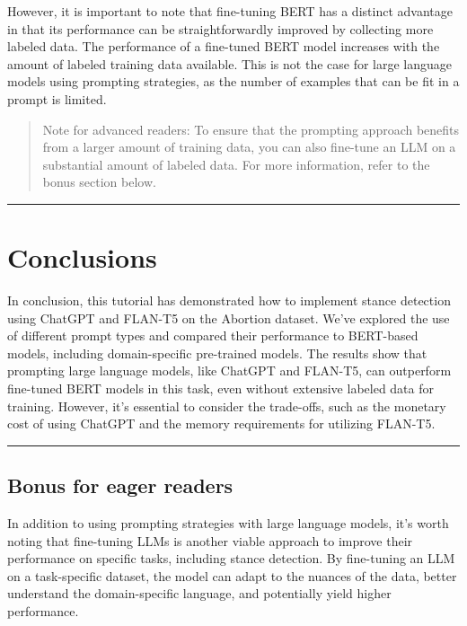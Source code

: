 \documentclass[11pt]{article}
\begin{document}
    However, it is important to note that fine-tuning BERT has a distinct
advantage in that its performance can be straightforwardly improved by
collecting more labeled data. The performance of a fine-tuned BERT model
increases with the amount of labeled training data available. This is
not the case for large language models using prompting strategies, as
the number of examples that can be fit in a prompt is limited.

\begin{quote}
Note for advanced readers: To ensure that the prompting approach
benefits from a larger amount of training data, you can also fine-tune
an LLM on a substantial amount of labeled data. For more information,
refer to the bonus section below.
\end{quote}

    \begin{center}\rule{0.5\linewidth}{0.5pt}\end{center}

    \hypertarget{conclusions}{%
\section{Conclusions}\label{conclusions}}

    In conclusion, this tutorial has demonstrated how to implement stance
detection using ChatGPT and FLAN-T5 on the Abortion dataset. We've
explored the use of different prompt types and compared their
performance to BERT-based models, including domain-specific pre-trained
models. The results show that prompting large language models, like
ChatGPT and FLAN-T5, can outperform fine-tuned BERT models in this task,
even without extensive labeled data for training. However, it's
essential to consider the trade-offs, such as the monetary cost of using
ChatGPT and the memory requirements for utilizing FLAN-T5.

    \begin{center}\rule{0.5\linewidth}{0.5pt}\end{center}

    \hypertarget{bonus-for-eager-readers}{%
\subsection{Bonus for eager readers}\label{bonus-for-eager-readers}}

    In addition to using prompting strategies with large language models,
it's worth noting that fine-tuning LLMs is another viable approach to
improve their performance on specific tasks, including stance detection.
By fine-tuning an LLM on a task-specific dataset, the model can adapt to
the nuances of the data, better understand the domain-specific language,
and potentially yield higher performance.
\end{document}
